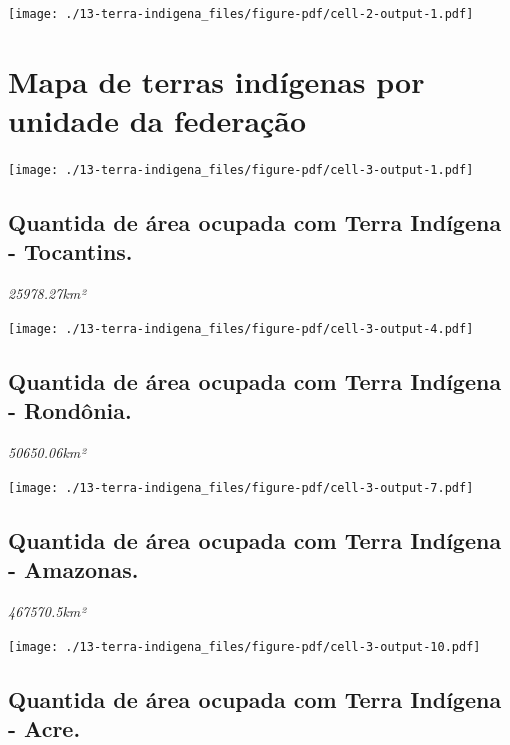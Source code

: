 \documentclass[
  letterpaper,
]{report}
\begin{document}
\texttt{[image: ./13-terra-indigena\_files/figure-pdf/cell-2-output-1.pdf]}

\hypertarget{mapa-de-terras-induxedgenas-por-unidade-da-federauxe7uxe3o}{%
\section{Mapa de terras indígenas por unidade da
federação}\label{mapa-de-terras-induxedgenas-por-unidade-da-federauxe7uxe3o}}

\texttt{[image: ./13-terra-indigena\_files/figure-pdf/cell-3-output-1.pdf]}

\hypertarget{quantida-de-uxe1rea-ocupada-com-terra-induxedgena---tocantins.}{%
\subsection{Quantida de área ocupada com Terra Indígena -
Tocantins.}\label{quantida-de-uxe1rea-ocupada-com-terra-induxedgena---tocantins.}}

\emph{25978.27km²}

\texttt{[image: ./13-terra-indigena\_files/figure-pdf/cell-3-output-4.pdf]}

\hypertarget{quantida-de-uxe1rea-ocupada-com-terra-induxedgena---ronduxf4nia.}{%
\subsection{Quantida de área ocupada com Terra Indígena -
Rondônia.}\label{quantida-de-uxe1rea-ocupada-com-terra-induxedgena---ronduxf4nia.}}

\emph{50650.06km²}

\texttt{[image: ./13-terra-indigena\_files/figure-pdf/cell-3-output-7.pdf]}

\hypertarget{quantida-de-uxe1rea-ocupada-com-terra-induxedgena---amazonas.}{%
\subsection{Quantida de área ocupada com Terra Indígena -
Amazonas.}\label{quantida-de-uxe1rea-ocupada-com-terra-induxedgena---amazonas.}}

\emph{467570.5km²}

\texttt{[image: ./13-terra-indigena\_files/figure-pdf/cell-3-output-10.pdf]}

\hypertarget{quantida-de-uxe1rea-ocupada-com-terra-induxedgena---acre.}{%
\subsection{Quantida de área ocupada com Terra Indígena -
Acre.}\label{quantida-de-uxe1rea-ocupada-com-terra-induxedgena---acre.}}
\end{document}
